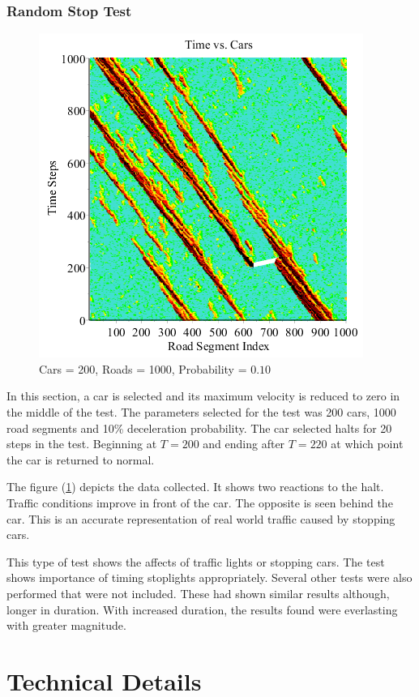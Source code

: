 \documentclass[12pt]{extarticle}
\begin{document}
\subsubsection{Random Stop Test}
\begin{figure}
	\includegraphics[scale=0.50]{Graph8.png}
	\caption{Cars = 200, Roads = 1000, \newline Probability = $0.10$}
	\label{fig:img8}
\end{figure}
In this section, a car is selected and its maximum velocity is reduced to zero in the middle of the test. The parameters selected for the test was 200 cars, 1000 road segments and 10\% deceleration probability. The car selected halts for 20 steps in the test. Beginning at $T=200$ and ending after $T=220$ at which point the car is returned to normal.

The figure (\ref{fig:img8}) depicts the data collected. It shows two reactions to the halt. Traffic conditions improve in front of the car. The opposite is seen behind the car. This is an accurate representation of real world traffic caused by stopping cars.

This type of test shows the affects of traffic lights or stopping cars. The test shows importance of timing stoplights appropriately. Several other tests were also performed that were not included. These had shown similar results although, longer in duration. With increased duration, the results found were everlasting with greater magnitude.

\section{Technical Details}
\end{document}
